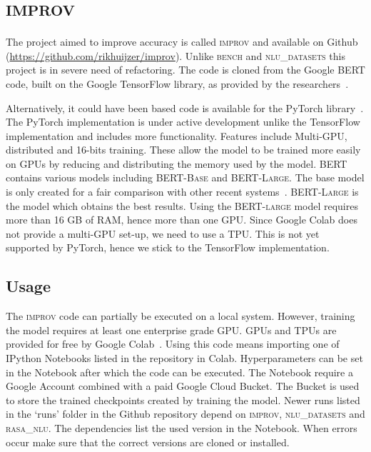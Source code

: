 \chapter{\textsc{improv}}
\label{ch:improv}
The project aimed to improve accuracy is called \textsc{improv} and available on Github (\url{https://github.com/rikhuijzer/improv}).
Unlike \textsc{bench} and \textsc{nlu\_datasets} this project is in severe need of refactoring.
The code is cloned from the Google BERT code, built on the Google TensorFlow library, as provided by the researchers~\citep{devlin2018github}.

Alternatively, it could have been based code is available for the PyTorch library~\citep{wolf2018github}.
The PyTorch implementation is under active development unlike the TensorFlow implementation and includes more functionality.
Features include Multi-GPU, distributed and 16-bits training.
These allow the model to be trained more easily on GPUs by reducing and distributing the memory used by the model.
BERT contains various models including \textsc{BERT-Base} and \textsc{BERT-Large}.
The base model is only created for a fair comparison with other recent systems~\citep{devlin2018github}.
\textsc{BERT-Large} is the model which obtains the best results.
Using the \textsc{BERT-large} model requires more than 16 GB of RAM, hence more than one GPU.
Since Google Colab does not provide a multi-GPU set-up, we need to use a TPU.
This is not yet supported by PyTorch, hence we stick to the TensorFlow implementation.

\section{Usage}
\label{sec:improv_usage}
The \textsc{improv} code can partially be executed on a local system.
However, training the model requires at least one enterprise grade GPU.
GPUs and TPUs are provided for free by Google Colab~\citep{google2019colab}.
Using this code means importing one of IPython Notebooks listed in the repository in Colab.
Hyperparameters can be set in the Notebook after which the code can be executed.
The Notebook require a Google Account combined with a paid Google Cloud Bucket.
The Bucket is used to store the trained checkpoints created by training the model.
Newer runs listed in the `runs' folder in the Github repository depend on \textsc{improv}, \textsc{nlu\_datasets} and \textsc{rasa\_nlu}.
The dependencies list the used version in the Notebook.
When errors occur make sure that the correct versions are cloned or installed.

\iffalse
\section{Overview}
\label{sec:improv_overview}
Since the code is in need of refactoring this section will only describe the most important parts of the project.

\fi
